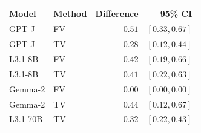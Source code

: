 \begin{tabular}{llrr}
\toprule
Model & Method & Difference & 95\% CI \\
\midrule
GPT-J & FV & $0.51$ & $[0.33,0.67]$ \\
GPT-J & TV & $0.28$ & $[0.12,0.44]$ \\
L3.1-8B & FV & $0.42$ & $[0.19,0.66]$ \\
L3.1-8B & TV & $0.41$ & $[0.22,0.63]$ \\
Gemma-2 & FV & $0.00$ & $[0.00,0.00]$ \\
Gemma-2 & TV & $0.44$ & $[0.12,0.67]$ \\
L3.1-70B & TV & $0.32$ & $[0.22,0.43]$ \\
\bottomrule
\end{tabular}
